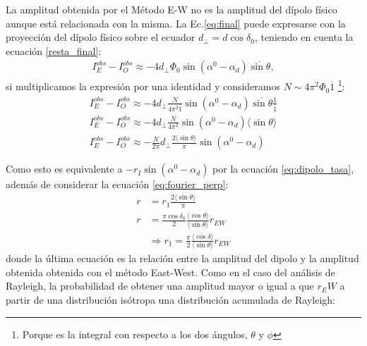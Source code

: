 La amplitud obtenida por el Método E-W no es la amplitud del dípolo físico aunque está relacionada con la misma. La Ec.\ref{eq:final} puede expresarse con la proyección del dípolo físico sobre el ecuador $d_{\perp}= d\cos\delta_0$, teniendo en cuenta la ecuación  \ref{resta_final}:
\begin{align}
    I^{obs}_E -  I^{obs}_O \approx -4 d_\perp \Phi_0 \sin(\alpha^0  - \alpha_d)\overline{\sin\theta},
\end{align}
si multiplicamos la expresión por una identidad y consideramos $N \sim 4\pi^2 \Phi_0 \overline{1} $ \footnote{Porque es la integral con respecto a los dos ángulos, $\theta$ y $\phi$}:
\begin{align}
    I^{obs}_E -  I^{obs}_O \approx -4 d_\perp \frac{N}{ 4\pi^2\overline{1}} \sin(\alpha^0  - \alpha_d)\overline{\sin\theta} \frac{\overline{1}}{\overline{1}}\\
    I^{obs}_E -  I^{obs}_O \approx -4 d_\perp \frac{N}{ 4\pi^2} \sin(\alpha^0  - \alpha_d)\langle\sin\theta \rangle\\
    I^{obs}_E -  I^{obs}_O \approx -\frac{N}{2\pi} d_\perp \frac{2\langle\sin\theta \rangle }{\pi}\sin(\alpha^0  - \alpha_d)
\end{align}


Como esto es equivalente a $-r_I\sin(\alpha^0  - \alpha_d)$ por la ecuación \ref{eq:dipolo_tasa}, además de considerar la ecuación \ref{eq:fourier_perp}:
\begin{align}
    r  &= r_1 \frac{2\langle\sin\theta \rangle }{\pi}\\
    r &= \frac{\pi \cos\delta_0}{2} \frac{\langle\cos\theta \rangle}{\langle\sin\theta \rangle} r_{EW} \\
    &\Rightarrow  r_1 = \frac{\pi}{2} \frac{\langle\cos\delta \rangle}{\langle\sin\theta \rangle} r_{EW}
\end{align}
donde la última ecuación es la relación entre la amplitud del dipolo y la amplitud obtenida obtenida con el método East-West. Como en el caso del análisis de Rayleigh, la probabilidad de obtener una amplitud mayor o igual a que $r_EW$ a partir de una distribución isótropa una distribución acumulada de Rayleigh:

